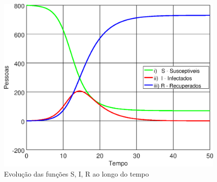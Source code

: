 \documentclass[portuguese, a4paper]{article}
\begin{document}
		\begin{figure}[H]
			\centering
			\includegraphics[width=0.80\linewidth]{IIIc_fitted}
			\captionsetup{width=0.80\linewidth}
			\caption{Evolução das funções S, I, R ao longo do tempo}
		\end{figure}
\end{document}
